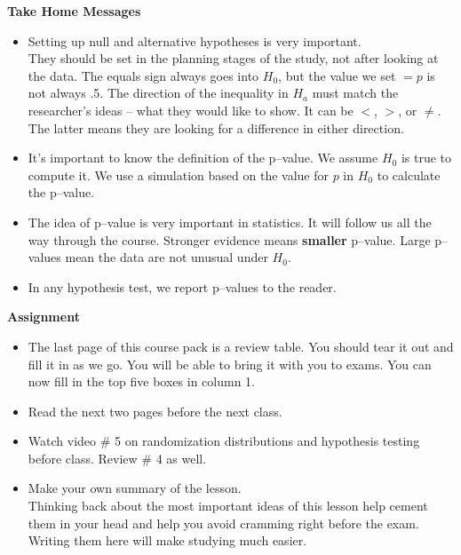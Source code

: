 {\bf Take Home Messages}
\begin{itemize}
  \item Setting up null and alternative hypotheses is very
    important.\\
    They should be set in the planning stages of the study, not after
    looking at the data. 
    The equals sign always goes into $H_0$, but the value we set $ = p$ is not
    always .5.  The direction of the inequality in $H_a$ must match
    the researcher's ideas -- what they would like to show. It can be
    $<$, $>$, or $\neq$.  The latter means they are looking for a
    difference in either direction.
  \item It's important to know the definition of the p--value. We
    assume $H_0$ is true to compute it.  We  use a simulation based
    on the  value for $p$  in $H_0$ to calculate the p--value.    
  \item The idea of p--value is very important in statistics. It will
    follow us all the way through the course. Stronger evidence means
    {\bf smaller} p--value.  Large p--values mean the data are not
    unusual under $H_0$.
  \item In any hypothesis test, we report p--values to the reader.  
\end{itemize}\vfill

{\bf Assignment}
\begin{itemize}
\item The last page of this course pack  is a review table. You should
  tear it out and fill it in as we go. You will be able to bring it
  with you to exams.  You can now fill in the top five boxes  in column 1.
\item Read the next two pages before the next class.
\item Watch video \#  5 on randomization distributions and
  hypothesis testing before class.  Review \# 4 as well.
 \item 
  Make your own summary of the lesson. \\
  Thinking back about the most important ideas of this lesson help
  cement them in your head and help you avoid cramming right before
  the exam.  Writing them here will make studying much easier.   
\end{itemize}


